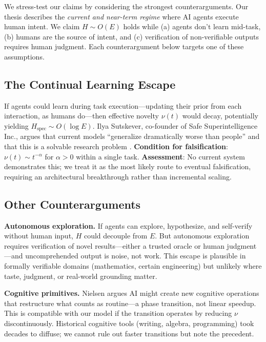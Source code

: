 \documentclass[11pt,a4paper]{article}
\begin{document}
We stress-test our claims by considering the strongest counterarguments. Our thesis describes the \emph{current and near-term regime} where AI agents execute human intent. We claim $H \sim O(E)$ holds while (a) agents don't learn mid-task, (b) humans are the source of intent, and (c) verification of non-verifiable outputs requires human judgment. Each counterargument below targets one of these assumptions.

\subsection{The Continual Learning Escape}

If agents could learn during task execution---updating their prior from each interaction, as humans do---then effective novelty $\nu(t)$ would decay, potentially yielding $H_{\text{spec}} \sim O(\log E)$. Ilya Sutskever, co-founder of Safe Superintelligence Inc., argues that current models ``generalize dramatically worse than people'' and that this is a solvable research problem \citep{sutskever2025}. \textbf{Condition for falsification}: $\nu(t) \sim t^{-\alpha}$ for $\alpha > 0$ within a single task. \textbf{Assessment}: No current system demonstrates this; we treat it as the most likely route to eventual falsification, requiring an architectural breakthrough rather than incremental scaling.

\subsection{Other Counterarguments}

\textbf{Autonomous exploration.} If agents can explore, hypothesize, and self-verify without human input, $H$ could decouple from $E$. But autonomous exploration requires verification of novel results---either a trusted oracle or human judgment---and uncomprehended output is noise, not work. This escape is plausible in formally verifiable domains (mathematics, certain engineering) but unlikely where taste, judgment, or real-world grounding matter.

\textbf{Cognitive primitives.} Nielsen \citep{nielsen2024} argues AI might create new cognitive operations that restructure what counts as routine---a phase transition, not linear speedup. This is compatible with our model if the transition operates by reducing $\nu$ discontinuously. Historical cognitive tools (writing, algebra, programming) took decades to diffuse; we cannot rule out faster transitions but note the precedent.
\end{document}
